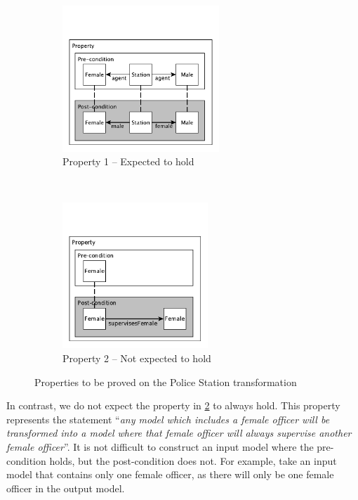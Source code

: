 \begin{figure}[thb]
        \centering
        \begin{subfigure}[b]{0.45\textwidth}
                \centering
                \includegraphics[height=5.5cm]{./figures/policestation_dsltrans/property1.pdf}
                \caption{Property 1 -- Expected to hold}
                \label{fig:dsltrans_prop1}
        \end{subfigure}%
        ~~
        \begin{subfigure}[b]{0.45\textwidth}
                \centering
                \includegraphics[height=5.5cm]{./figures/policestation_dsltrans/property2.pdf}
                \caption{Property 2 -- Not expected to hold}
                \label{fig:dsltrans_prop2}
        \end{subfigure}%
        \caption{ Properties to be proved on the Police Station transformation}
        \label{fig:properties}
\end{figure}

In contrast, we do not expect the property in \cref{fig:dsltrans_prop2} to always hold. This property represents the statement ``\emph{any model which includes a
female officer will be transformed into a model where that female officer will
always supervise another female officer}''. It is not difficult to construct an input model where the pre-condition holds, but the post-condition does not. For example, take an input model that contains only one female officer, as there will only be one female officer in the output model.

